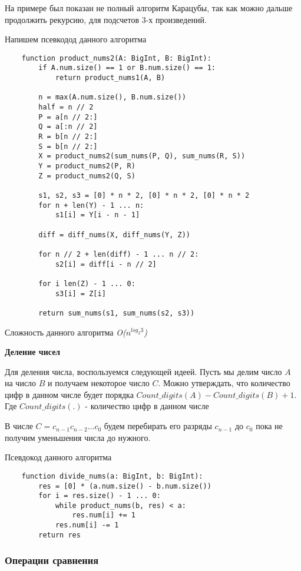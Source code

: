 \documentclass[a4paper,article,14pt]{extarticle}
\begin{document}
На примере был показан не полный алгоритм Карацубы, так как можно дальше
продолжить рекурсию, для подсчетов $3$-х произведений.

Напишем псевкодод данного алгоритма
\begin{lstlisting}
    function product_nums2(A: BigInt, B: BigInt):
        if A.num.size() == 1 or B.num.size() == 1:
            return product_nums1(A, B)
        
        n = max(A.num.size(), B.num.size())
        half = n // 2
        P = a[n // 2:]
        Q = a[:n // 2]
        R = b[n // 2:]
        S = b[n // 2:]
        X = product_nums2(sum_nums(P, Q), sum_nums(R, S))
        Y = product_nums2(P, R)
        Z = product_nums2(Q, S)

        s1, s2, s3 = [0] * n * 2, [0] * n * 2, [0] * n * 2
        for n + len(Y) - 1 ... n:
            s1[i] = Y[i - n - 1]
            
        diff = diff_nums(X, diff_nums(Y, Z))    
        
        for n // 2 + len(diff) - 1 ... n // 2:
            s2[i] = diff[i - n // 2]
        
        for i len(Z) - 1 ... 0:
            s3[i] = Z[i]
        
        return sum_nums(s1, sum_nums(s2, s3))
\end{lstlisting}

Сложность данного алгоритма \emph{O($n^{log_2{3}}$)}

\textbf{Деление чисел}

Для деления числа, воспользуемся следующей идеей. 
Пусть мы делим число $A$ на число $B$ и получаем некоторое число $C$. 
Можно утверждать, что количество цифр в данном числе будет порядка 
$ Count\_digits(A) - Count\_digits(B) + 1 $. 
Где $ Count\_digits(.)$ - количество цифр в данном числе

В числе $C = c_{n - 1}c_{n - 2}...c_0$ будем перебирать 
его разряды $c_{n - 1}$ до $c_0$ пока не получим уменьшения числа до нужного.

Псевдокод данного алгоритма

\begin{lstlisting}
    function divide_nums(a: BigInt, b: BigInt):
        res = [0] * (a.num.size() - b.num.size())
        for i = res.size() - 1 ... 0:
            while product_nums(b, res) < a:
                res.num[i] += 1
            res.num[i] -= 1
        return res
\end{lstlisting}


\subsubsection{Операции сравнения}
\end{document}
